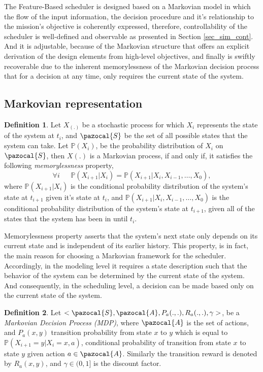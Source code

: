 \documentclass[12pt,aas_macros]{article}
\theoremstyle{definition}
\newtheorem{defn}{Definition}
\begin{document}
The Feature-Based scheduler is designed based on a Markovian model in which the flow of the input information, the decision procedure and it's relationship to the mission's objective is coherently expressed, therefore, controllability of the scheduler is well-defined and observable as presented in Section \ref{sec_sim_cont}. And it is adjustable, because of the Markovian structure that offers an explicit derivation of the design elements from high-level objectives, and finally is swiftly recoverable due to the inherent memorylessness of the Markovian decision process that for a decision at any time, only requires the current state of the system.

\subsection{Markovian representation}\label{sec_Markov}

\begin{defn}
Let $X_{(.)}$ be a stochastic process for which $X_i$ represents the state of the system at $t_i$, and $\pazocal{S}$ be the set of all possible states that the system can take. Let $\mathbb{P}(X_i)$, be the probability distribution of $X_i$ on $\pazocal{S}$, then $X(.)$ is a Markovian process, if and only if, it satisfies the following \textit{memorylessness} property,
\begin{equation*}
\forall i ~~~~~~~\mathbb{P}(X_{{i+1}} | X_{i}) = \mathbb{P}(X_{{i+1}} | X_{i}, X_{{i-1}},\dots, X_{0}),
\end{equation*}
where $\mathbb{P}(X_{{i+1}} | X_{i})$ is the conditional probability distribution of the system's state at $t_{i+1}$ given it's state at $t_i$, and $\mathbb{P}(X_{{i+1}} | X_{i}, X_{{i-1}},\dots, X_{0})$ is the conditional probability distribution of the system's state at $t_{i+1}$, given all of the states that the system has been in until $t_i$.
\end{defn}

Memorylessness property asserts that the system's next state only depends on its current state and is independent of its earlier history. This property, is in fact, the main reason for choosing a Markovian framework for the scheduler. Accordingly, in the modeling level it requires a state description such that the behavior of the system can be determined by the current state of the system. And consequently, in the scheduling level, a decision can be made based only on the current state of the system.

\begin{defn}
Let $<\pazocal{S},\pazocal{A}, P_a(.,.), R_a(.,.), \gamma>$, be a \textit{Markovian Decision Process (MDP)}, where $\pazocal{A}$ is the set of actions, and $P_a(x, y)$ transition probability from state $x$ to $y$ which is equal to $\mathbb{P}(X_{i+1}=y | X_i=x, a)$, conditional probability of transition from state $x$ to state $y$ given action $a \in  \pazocal{A}$. Similarly the transition reward is denoted by $R_a(x,y)$, and $\gamma \in (0,1]$ is the discount factor.
\end{defn}
\end{document}
